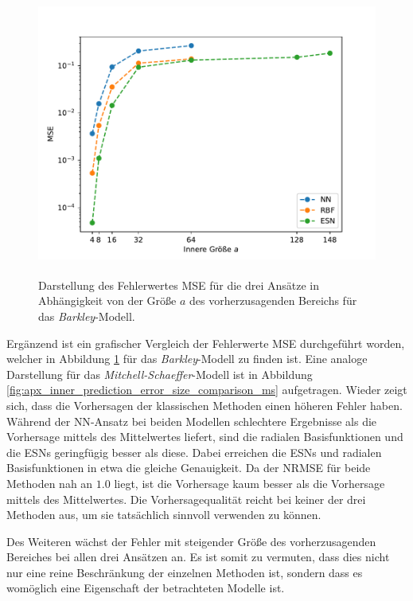 \begin{figure}[H]
	\centering
	\includegraphics[height=3.7in]{figures/results/inner_cross_prediction/barkley_error_size_comparison.pdf}
	\caption{Darstellung des Fehlerwertes MSE für die drei Ansätze in Abhängigkeit von der Größe $a$ des vorherzusagenden Bereichs für das \textit{Barkley}-Modell.}
	\label{fig:inner_prediction_error_size_comparison_barkley}
\end{figure}
 
Ergänzend ist ein grafischer Vergleich der Fehlerwerte MSE durchgeführt worden, welcher in Abbildung \ref{fig:inner_prediction_error_size_comparison_barkley} für das \textit{Barkley}-Modell zu finden ist. Eine analoge Darstellung für das \textit{Mitchell-Schaeffer}-Modell ist in Abbildung \ref{fig:apx_inner_prediction_error_size_comparison_ms} aufgetragen. Wieder zeigt sich, dass die Vorhersagen der klassischen Methoden einen höheren Fehler haben. Während der \textsc{NN}-Ansatz bei beiden Modellen schlechtere Ergebnisse als die Vorhersage mittels des Mittelwertes liefert, sind die radialen Basisfunktionen und die \textsc{ESN}s geringfügig besser als diese. Dabei erreichen die \textsc{ESN}s und radialen Basisfunktionen in etwa die gleiche Genauigkeit. Da der NRMSE für beide Methoden nah an $1.0$ liegt, ist die Vorhersage kaum besser als die Vorhersage mittels des Mittelwertes. Die Vorhersagequalität reicht bei keiner der drei Methoden aus, um sie tatsächlich sinnvoll verwenden zu können. 

Des Weiteren wächst der Fehler mit steigender Größe des vorherzusagenden Bereiches bei allen drei Ansätzen an. Es ist somit zu vermuten, dass dies nicht nur eine reine Beschränkung der einzelnen Methoden ist, sondern dass es womöglich eine Eigenschaft der betrachteten Modelle ist. 

